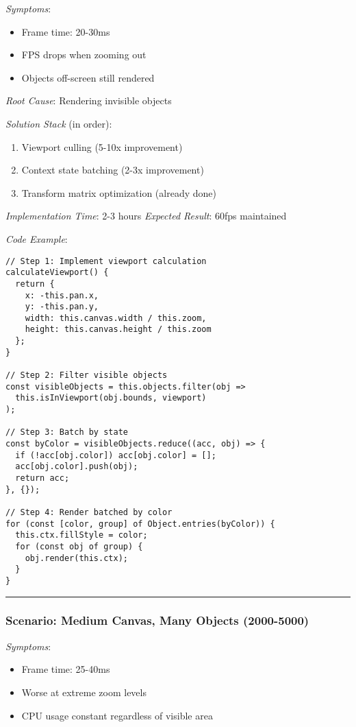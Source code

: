 \documentclass[11pt]{article}
\begin{document}
\emph{Symptoms}:
\begin{itemize}
\item Frame time: 20-30ms
\item FPS drops when zooming out
\item Objects off-screen still rendered
\end{itemize}

\emph{Root Cause}: Rendering invisible objects

\emph{Solution Stack} (in order):
\begin{enumerate}
\item Viewport culling (5-10x improvement)
\item Context state batching (2-3x improvement)
\item Transform matrix optimization (already done)
\end{enumerate}

\emph{Implementation Time}: 2-3 hours
\emph{Expected Result}: 60fps maintained

\emph{Code Example}:
\begin{verbatim}
// Step 1: Implement viewport calculation
calculateViewport() {
  return {
    x: -this.pan.x,
    y: -this.pan.y,
    width: this.canvas.width / this.zoom,
    height: this.canvas.height / this.zoom
  };
}

// Step 2: Filter visible objects
const visibleObjects = this.objects.filter(obj => 
  this.isInViewport(obj.bounds, viewport)
);

// Step 3: Batch by state
const byColor = visibleObjects.reduce((acc, obj) => {
  if (!acc[obj.color]) acc[obj.color] = [];
  acc[obj.color].push(obj);
  return acc;
}, {});

// Step 4: Render batched by color
for (const [color, group] of Object.entries(byColor)) {
  this.ctx.fillStyle = color;
  for (const obj of group) {
    obj.render(this.ctx);
  }
}
\end{verbatim}

\noindent\rule{\textwidth}{0.5pt}
\subsubsection{Scenario: Medium Canvas, Many Objects (2000-5000)}
\label{sec:orgf8fb8a7}

\emph{Symptoms}:
\begin{itemize}
\item Frame time: 25-40ms
\item Worse at extreme zoom levels
\item CPU usage constant regardless of visible area
\end{itemize}
\end{document}
